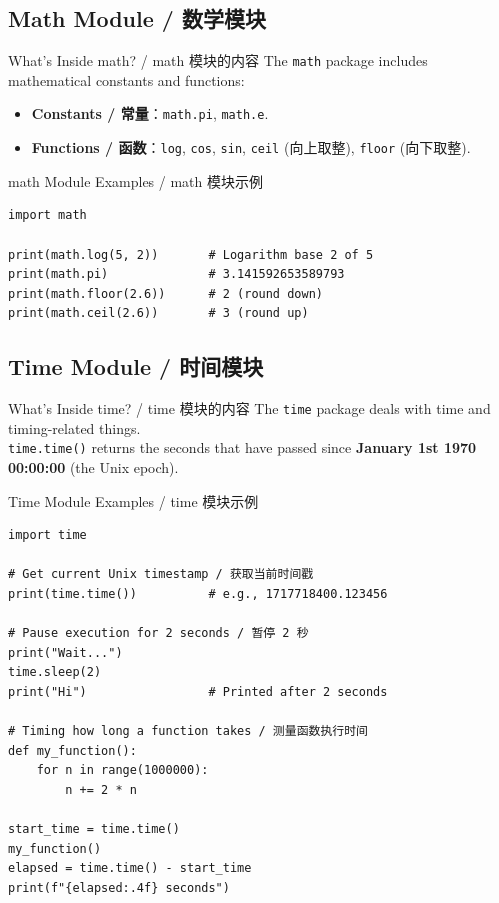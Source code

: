 \documentclass[11pt,a4paper]{article}
\begin{document}
\subsection{Math Module / 数学模块}

\begin{concept}{What's Inside math? / math 模块的内容}
    The \texttt{math} package includes mathematical constants and functions:
    \begin{itemize}[itemsep=0.3em]
        \item \textbf{Constants / 常量}：\texttt{math.pi}, \texttt{math.e}.
        \item \textbf{Functions / 函数}：\texttt{log}, \texttt{cos}, \texttt{sin}, \texttt{ceil} (向上取整), \texttt{floor} (向下取整).
    \end{itemize}
\end{concept}

\begin{examplebox}{math Module Examples / math 模块示例}
\begin{lstlisting}
import math

print(math.log(5, 2))       # Logarithm base 2 of 5
print(math.pi)              # 3.141592653589793
print(math.floor(2.6))      # 2 (round down)
print(math.ceil(2.6))       # 3 (round up)
\end{lstlisting}
\end{examplebox}

\subsection{Time Module / 时间模块}

\begin{concept}{What's Inside time? / time 模块的内容}
    The \texttt{time} package deals with time and timing-related things. \\
    \texttt{time.time()} returns the seconds that have passed since \textbf{January 1st 1970 00:00:00} (the Unix epoch).
\end{concept}

\begin{examplebox}{Time Module Examples / time 模块示例}
\begin{lstlisting}
import time

# Get current Unix timestamp / 获取当前时间戳
print(time.time())          # e.g., 1717718400.123456

# Pause execution for 2 seconds / 暂停 2 秒
print("Wait...")
time.sleep(2)
print("Hi")                 # Printed after 2 seconds

# Timing how long a function takes / 测量函数执行时间
def my_function():
    for n in range(1000000):
        n += 2 * n

start_time = time.time()
my_function()
elapsed = time.time() - start_time
print(f"{elapsed:.4f} seconds")
\end{lstlisting}
\end{examplebox}
\end{document}
